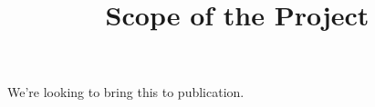 \documentclass{article}
\begin{document}
\title{Scope of the Project}

\maketitle

We're looking to bring this to publication.
\end{document}
